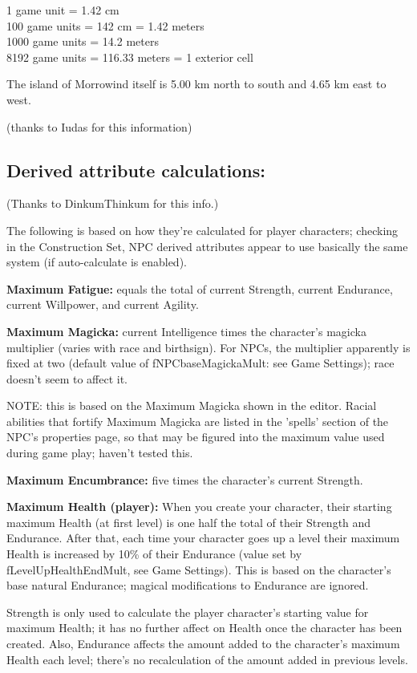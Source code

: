 1 game unit = 1.42 cm\\
100 game units = 142 cm = 1.42 meters\\
1000 game units = 14.2 meters\\
8192 game units = 116.33 meters = 1 exterior cell

The island of Morrowind itself is 5.00 km north to south and 4.65 km
east to west.

(thanks to Iudas for this information)

\hypertarget{derived-attribute-calculations}{%
\subsection{Derived attribute
calculations:}\label{derived-attribute-calculations}}

(Thanks to DinkumThinkum for this info.)

The following is based on how they're calculated for player characters;
checking in the Construction Set, NPC derived attributes appear to use
basically the same system (if auto-calculate is enabled).

\textbf{Maximum Fatigue:} equals the total of current Strength, current
Endurance, current Willpower, and current Agility.

\textbf{Maximum Magicka:} current Intelligence times the character's
magicka multiplier (varies with race and birthsign). For NPCs, the
multiplier apparently is fixed at two (default value of
fNPCbaseMagickaMult: see Game Settings); race doesn't seem to affect it.

NOTE: this is based on the Maximum Magicka shown in the editor. Racial
abilities that fortify Maximum Magicka are listed in the 'spells'
section of the NPC's properties page, so that may be figured into the
maximum value used during game play; haven't tested this.

\textbf{Maximum Encumbrance:} five times the character's current
Strength.

\textbf{Maximum Health (player):} When you create your character, their
starting maximum Health (at first level) is one half the total of their
Strength and Endurance. After that, each time your character goes up a
level their maximum Health is increased by 10\% of their Endurance
(value set by fLevelUpHealthEndMult, see Game Settings). This is based
on the character's base natural Endurance; magical modifications to
Endurance are ignored.

Strength is only used to calculate the player character's starting value
for maximum Health; it has no further affect on Health once the
character has been created. Also, Endurance affects the amount added to
the character's maximum Health each level; there's no recalculation of
the amount added in previous levels.

